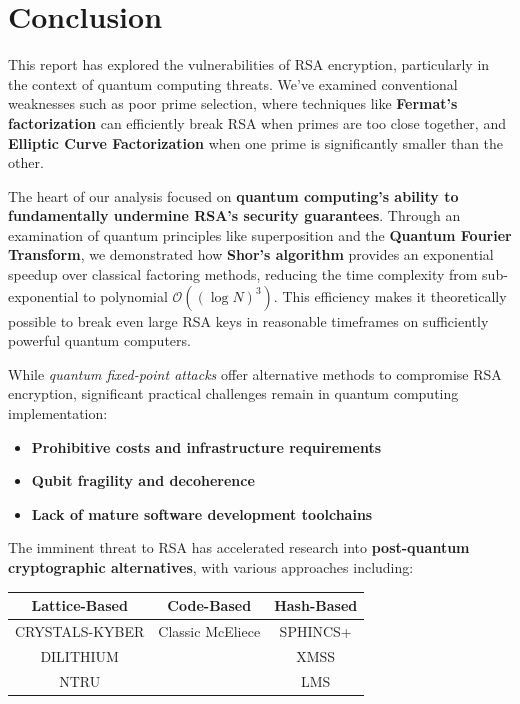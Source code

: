 \documentclass{article}
\begin{document}
\newpage

\section{Conclusion}

\begin{infobox}[title=Summary of Findings]
    This report has explored the vulnerabilities of RSA encryption, particularly in the context of quantum computing threats. We've examined conventional weaknesses such as poor prime selection, where techniques like \textbf{Fermat's factorization} can efficiently break RSA when primes are too close together, and \textbf{Elliptic Curve Factorization} when one prime is significantly smaller than the other.

    The heart of our analysis focused on \textbf{quantum computing's ability to fundamentally undermine RSA's security guarantees}. Through an examination of quantum principles like superposition and the \textbf{Quantum Fourier Transform}, we demonstrated how \textbf{Shor's algorithm} provides an exponential speedup over classical factoring methods, reducing the time complexity from sub-exponential to polynomial \textbf{$\mathcal{O}((\log N)^3)$}. This efficiency makes it theoretically possible to break even large RSA keys in reasonable timeframes on sufficiently powerful quantum computers.

    While \textit{quantum fixed-point attacks} offer alternative methods to compromise RSA encryption, significant practical challenges remain in quantum computing implementation:

    \begin{itemize}
        \item \textbf{Prohibitive costs and infrastructure requirements}
        \item \textbf{Qubit fragility and decoherence}
        \item \textbf{Lack of mature software development toolchains}
    \end{itemize}

    The imminent threat to RSA has accelerated research into \textbf{post-quantum cryptographic alternatives}, with various approaches including:

    \begin{center}
        \begin{tabular}{|c|c|c|}
            \hline
            \rowcolor{gray!20} \textbf{Lattice-Based} & \textbf{Code-Based} & \textbf{Hash-Based} \\
            \hline
            CRYSTALS-KYBER                            & Classic McEliece    & SPHINCS+            \\
            DILITHIUM                                 &                     & XMSS                \\
            NTRU                                      &                     & LMS                 \\
            \hline
        \end{tabular}
    \end{center}


\end{infobox}
\end{document}

